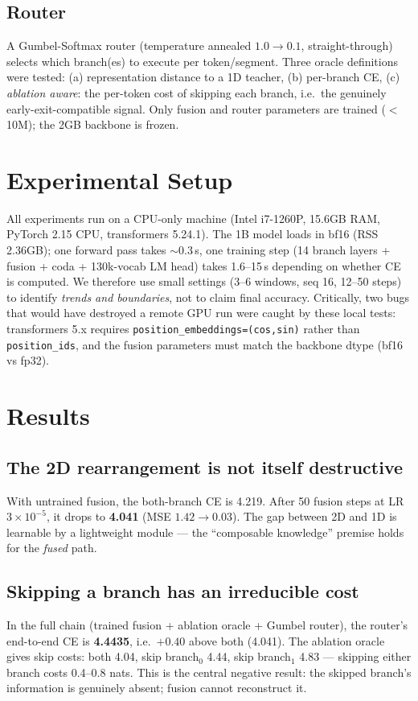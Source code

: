 \documentclass[11pt,a4paper]{article}
\begin{document}
\subsection{Router}
A Gumbel-Softmax router (temperature annealed $1.0\to0.1$, straight-through)
selects which branch(es) to execute per token/segment. Three oracle definitions were
tested: (a) representation distance to a 1D teacher, (b) per-branch CE, (c)
\emph{ablation aware}: the per-token cost of skipping each branch, i.e.\ the genuinely
early-exit-compatible signal. Only fusion and router parameters are trained
($<$10M); the 2GB backbone is frozen.

\section{Experimental Setup}

All experiments run on a CPU-only machine (Intel i7-1260P, 15.6GB RAM, PyTorch 2.15
CPU, transformers 5.24.1). The 1B model loads in bf16 (RSS 2.36GB); one forward pass
takes $\sim$0.3\,s, one training step (14 branch layers + fusion + coda + 130k-vocab
LM head) takes 1.6--15\,s depending on whether CE is computed. We therefore use small
settings (3--6 windows, seq 16, 12--50 steps) to identify \emph{trends and boundaries},
not to claim final accuracy. Critically, two bugs that would have destroyed a remote
GPU run were caught by these local tests: transformers 5.x requires
\texttt{position\_embeddings=(cos,sin)} rather than \texttt{position\_ids}, and the
fusion parameters must match the backbone dtype (bf16 vs fp32).

\section{Results}

\subsection{The 2D rearrangement is not itself destructive}
With untrained fusion, the both-branch CE is 4.219. After 50 fusion steps at
LR $3\times10^{-5}$, it drops to \textbf{4.041} (MSE $1.42\to0.03$). The gap between
2D and 1D is learnable by a lightweight module --- the ``composable knowledge''
premise holds for the \emph{fused} path.

\subsection{Skipping a branch has an irreducible cost}
In the full chain (trained fusion + ablation oracle + Gumbel router), the router's
end-to-end CE is \textbf{4.4435}, i.e.\ $+0.40$ above both (4.041). The ablation
oracle gives skip costs: both 4.04, skip branch$_0$ 4.44, skip branch$_1$ 4.83
--- skipping either branch costs 0.4--0.8 nats. This is the central negative result:
the skipped branch's information is genuinely absent; fusion cannot reconstruct it.
\end{document}
